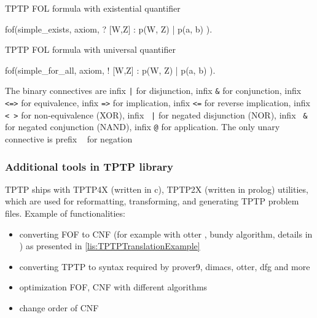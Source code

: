 \begin{listing}[H]
  \caption{TPTP FOL formula with existential quantifier}
  \label{lis:TPTPExistenstialQuantifier}
\begin{tptpcode}
fof(simple_exists, axiom,
 ? [W,Z] : p(W, Z) | p(a, b)
  ).
\end{tptpcode}
\end{listing}

\begin{listing}[H]
  \caption{TPTP FOL formula with universal quantifier}
  \label{lis:TPTPUniversalQuantifier}
\begin{tptpcode}
fof(simple_for_all, axiom,
 ! [W,Z] : p(W, Z) | p(a, b)
  ).
\end{tptpcode}
\end{listing}
The binary connectives are infix \texttt{|} for disjunction, infix \texttt{&} for conjunction, infix \texttt{<=>} for equivalence, infix \texttt{=>} for implication, infix \texttt{<=} for reverse implication, infix \texttt{<~>} for non-equivalence (XOR), infix \texttt{~|} for negated disjunction (NOR), infix	\texttt{~&} for negated conjunction (NAND), infix \texttt{@} for application. The only unary connective is prefix \texttt{~} for negation

\subsubsection{Additional tools in TPTP library}
\label{sub:AdditionalToolsInTPTPLibrary}

TPTP ships with \gls{TPTP4X} (written in c), \gls{TPTP2X} (written in prolog) utilities, which are used for reformatting, transforming, and generating TPTP problem files. Example of functionalities:

\begin{itemize}
  \item converting \gls{FOF} to \gls{CNF} (for example with otter \cite{McC-Otter-URL}, bundy \cite{Bun83} algorithm, details in \cite{SM96}) as presented in \ref{lis:TPTPTranslationExample}
  \item converting TPTP to syntax required by prover9, dimacs, otter, dfg and more
  \item optimization \gls{FOF}, \gls{CNF} with different algorithms
  \item change order of \gls{CNF}
\end{itemize}

